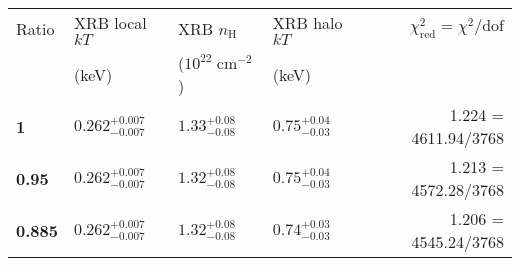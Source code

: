 \documentclass[preprint2,tighten,trackchanges]{aastex6}
\newcommand*{\mt}{\mathrm}
\newcommand*{\unit}[1]{\;\mt{#1}}  %
\begin{document}
\begin{table*}[!h]
    \begin{tabular}{@{}llllr@{}}
    \toprule
    Ratio & XRB local $kT$ & XRB $n_\mathrm{H}$ & XRB halo $kT$
           & $\chi^2_{\mathrm{red}} = \chi^2/\mathrm{dof}$ \\
     & (keV) & ($10^{22} \unit{cm^{-2}}$) & (keV) &  \\
    \midrule
    \textbf{1} & ${0.262}^{+0.007}_{-0.007}$ & ${1.33}^{+0.08}_{-0.08}$ & ${0.75}^{+0.04}_{-0.03}$
          & 1.224 = 4611.94/3768 \\
    \textbf{0.95} & ${0.262}^{+0.007}_{-0.007}$ & $1.32^{+0.08}_{-0.08}$ & $0.75^{+0.04}_{-0.03}$ %
          & 1.213 = 4572.28/3768 \\
    \textbf{0.885} & ${0.262}^{+0.007}_{-0.007}$ & ${1.32}^{+0.08}_{-0.08}$ & ${0.74}^{+0.03}_{-0.03}$
          & 1.206 = 4545.24/3768 \\
    \bottomrule
    \end{tabular}
\end{table*}
\end{document}
